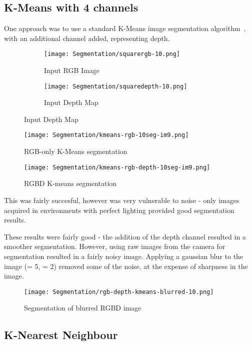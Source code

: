 \subsection{K-Means with 4 channels}
One approach was to use a standard K-Means image segmentation algorithm~\cite{kmeans-matlab}, with an additional channel added, representing depth. 

\begin{figure}[H]
    \centering
    \begin{subfigure}[b]{0.45\textwidth}
        \centering
        \texttt{[image: Segmentation/squarergb-10.png]}
        \caption{Input RGB Image}
    \end{subfigure}
    \hfill
    \begin{subfigure}[b]{0.45\textwidth}
        \centering
        \texttt{[image: Segmentation/squaredepth-10.png]}
        \caption{Input Depth Map}
    \end{subfigure}
\end{figure}

\begin{figure}[H]
    \centering
    \texttt{[image: Segmentation/kmeans-rgb-10seg-im9.png]}
    \caption{RGB-only K-Means segmentation}
\end{figure}

\begin{figure}[H]
    \centering
    \texttt{[image: Segmentation/kmeans-rgb-depth-10seg-im9.png]}
    \caption{RGBD K-means segmentation}
\end{figure}

This was fairly succesful, however was very vulnerable to noise - only images acquired in environments with perfect lighting provided good segmentation results. 

These results were fairly good - the addition of the depth channel resulted in a smoother segmentation. However, using raw images from the camera for segmentation resulted in a fairly noisy image. Applying a gaussian blur to the image (\diameter = 5, \sigma = 2) removed some of the noise, at the expense of sharpness in the image.

\begin{figure}[H]
    \centering
    \texttt{[image: Segmentation/rgb-depth-kmeans-blurred-10.png]}
    \caption{Segmentation of blurred RGBD image}
\end{figure}

\subsection{K-Nearest Neighbour}

